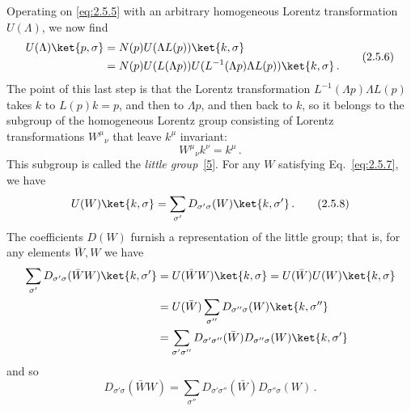 Operating on \eqref{eq:2.5.5} with an arbitrary homogeneous Lorentz transformation
$U(\Lambda)$, we now find
\begin{equation}
\begin{aligned}
U(\Lambda)\ket{p,\sigma}
&=N(p)U(\Lambda L(p))\ket{k,\sigma}\\
&=N(p)U(L(\Lambda p))
U(L^{-1}(\Lambda p)\Lambda L(p))\ket{k,\sigma}\,.
\end{aligned}
\tag{2.5.6}\label{eq:2.5.6}
\end{equation}
The point of this last step is that the Lorentz transformation
$L^{-1}(\Lambda p)\Lambda L(p)$ takes $k$ to $L(p)k=p$, and then to
$\Lambda p$, and then back to $k$, so it belongs to the subgroup of the
homogeneous Lorentz group consisting of Lorentz transformations
$W^\mu{}_{\nu}$ that leave $k^\mu$ invariant:
\begin{equation}
W^\mu{}_{\nu}k^\nu=k^\mu\,.
\tag{2.5.7}\label{eq:2.5.7}
\end{equation}
This subgroup is called the \emph{little group}~\hyperref[ref:2.5]{[5]}. For any
$W$ satisfying Eq.~\eqref{eq:2.5.7}, we have
\begin{equation}
U(W)\ket{k,\sigma}
=\sum_{\sigma'}D_{\sigma'\sigma}(W)\ket{k,\sigma'}\,.
\tag{2.5.8}\label{eq:2.5.8}
\end{equation}
The coefficients $D(W)$ furnish a representation of the little group; that is,
for any elements $\bar W,W$ we have
\[
\begin{aligned}
\sum_{\sigma'}D_{\sigma'\sigma}(\bar W W)\ket{k,\sigma'}
&=U(\bar W W)\ket{k,\sigma}=U(\bar W)U(W)\ket{k,\sigma}\\
&=U(\bar W)\sum_{\sigma''}D_{\sigma''\sigma}(W)\ket{k,\sigma''}\\
&=\sum_{\sigma'\sigma''}D_{\sigma'\sigma''}(\bar W)
D_{\sigma''\sigma}(W)\ket{k,\sigma'}
\end{aligned}
\]
and so
\begin{equation}
D_{\sigma'\sigma}(\bar W W)
=\sum_{\sigma''}D_{\sigma'\sigma''}(\bar W)D_{\sigma''\sigma}(W)\,.
\tag{2.5.9}\label{eq:2.5.9}
\end{equation}

